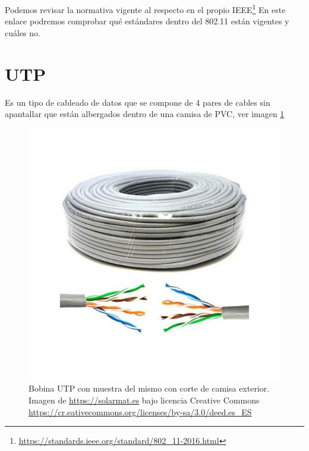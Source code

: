 Podemos revisar la normativa vigente al respecto en el propio IEEE\footnote{\url{https://standards.ieee.org/standard/802_11-2016.html}}
En este enlace podremos comprobar qué estándares dentro del 802.11 están vigentes y cuáles no.

\section{UTP}
Es un tipo de cableado de datos que se compone de 4 pares de cables sin apantallar que están albergados dentro de una camisa de PVC, ver imagen \ref{Img:Bobina UTP}

\begin{figure}
    \centering
    \includegraphics[width=.6\textwidth]{img/bobina_UTP.pdf}
    \caption{Bobina UTP con muestra del mismo con corte de camisa exterior. Imagen de \url{https://solarmat.es} bajo licencia Creative Commons \url{https://cr.eativecommons.org/licenses/by-sa/3.0/deed.es_ES} } \label{Img:Bobina UTP}
\end{figure}



